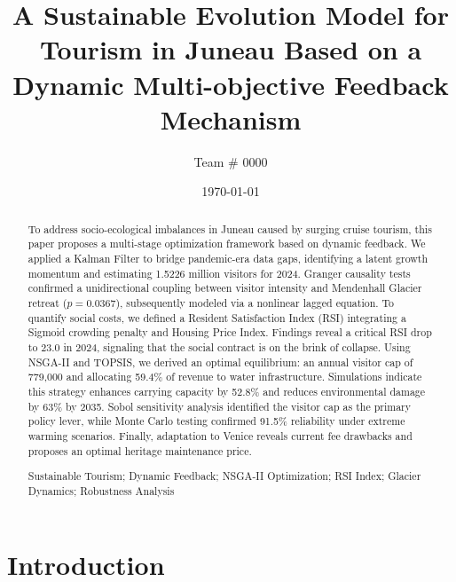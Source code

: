 \documentclass{mcmthesis}
\title{A Sustainable Evolution Model for Tourism in Juneau Based on a Dynamic Multi-objective Feedback Mechanism}
\author{Team \# 0000}
\date{\today}
\begin{document}
\begin{abstract}
	To address socio-ecological imbalances in Juneau caused by surging cruise tourism, this paper proposes a multi-stage optimization framework based on dynamic feedback. We applied a Kalman Filter to bridge pandemic-era data gaps, identifying a latent growth momentum and estimating 1.5226 million visitors for 2024. Granger causality tests confirmed a unidirectional coupling between visitor intensity and Mendenhall Glacier retreat ($p=0.0367$), subsequently modeled via a nonlinear lagged equation. To quantify social costs, we defined a Resident Satisfaction Index (RSI) integrating a Sigmoid crowding penalty and Housing Price Index. Findings reveal a critical RSI drop to 23.0 in 2024, signaling that the social contract is on the brink of collapse. Using NSGA-II and TOPSIS, we derived an optimal equilibrium: an annual visitor cap of 779,000 and allocating 59.4\% of revenue to water infrastructure. Simulations indicate this strategy enhances carrying capacity by 52.8\% and reduces environmental damage by 63\% by 2035. Sobol sensitivity analysis identified the visitor cap as the primary policy lever, while Monte Carlo testing confirmed 91.5\% reliability under extreme warming scenarios. Finally, adaptation to Venice reveals current fee drawbacks and proposes an optimal  heritage maintenance price.
	
	\begin{keywords}
		Sustainable Tourism; Dynamic Feedback; NSGA-II Optimization; RSI Index; Glacier Dynamics; Robustness Analysis
	\end{keywords}
\end{abstract}

\maketitle

\tableofcontents
\newpage


\section{Introduction}
\end{document}
